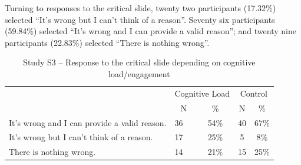 \documentclass[
  man,floatsintext]{apa6}
\begin{document}
Turning to responses to the critical slide, twenty two participants (17.32\%) selected ``It's wrong but I can't think of a reason''. Seventy six participants (59.84\%) selected ``It's wrong and I can provide a valid reason''; and twenty nine participants (22.83\%) selected ``There is nothing wrong''.

\begin{table}[tbp]

\begin{center}
\begin{threeparttable}

\caption{\label{tab:tabS3tab1dumb1all}Study S3 – Response to the critical slide depending on cognitive load/engagement}

\begin{tabular}{llccc}
\toprule
 & \multicolumn{2}{c}{Cognitive Load} & \multicolumn{2}{c}{Control} \\
\cmidrule(r){2-3} \cmidrule(r){4-5}
 & \multicolumn{1}{c}{N} & \multicolumn{1}{c}{\%} & \multicolumn{1}{c}{N} & \multicolumn{1}{c}{\%}\\
\midrule
It's wrong and I can provide a valid reason. & 36 & 54\% & 40 & 67\%\\
It's wrong but I can't think of a reason. & 17 & 25\% & 5 & 8\%\\
There is nothing wrong. & 14 & 21\% & 15 & 25\%\\
\bottomrule
\end{tabular}

\end{threeparttable}
\end{center}

\end{table}

\newpage
\end{document}
